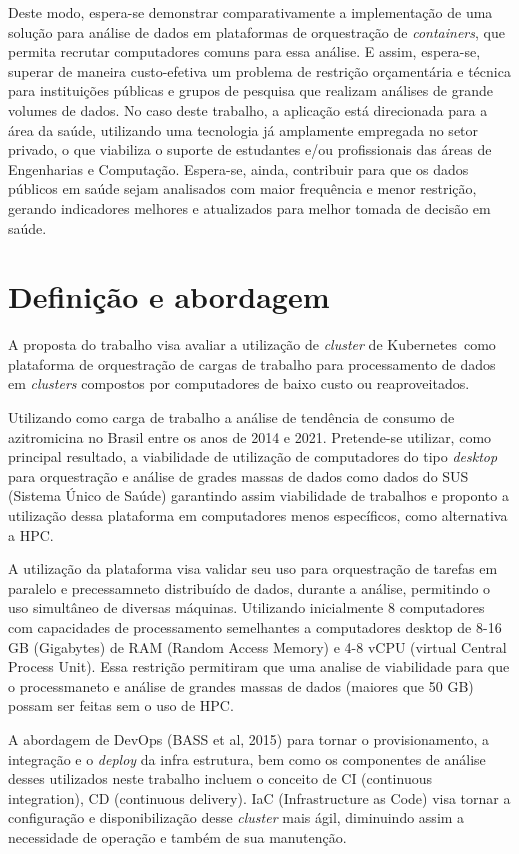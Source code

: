 Deste modo, espera-se demonstrar comparativamente a implementação de uma solução para análise de dados em plataformas de orquestração de \emph{containers}, que permita recrutar computadores comuns para essa análise. E assim, espera-se, superar de maneira custo-efetiva um problema de restrição orçamentária e técnica para instituições públicas e grupos de pesquisa que realizam análises de grande volumes de dados. No caso deste trabalho, a aplicação está direcionada para a área da saúde, utilizando uma tecnologia já amplamente empregada no setor privado, o que viabiliza o suporte de estudantes e/ou profissionais das áreas de Engenharias e Computação. Espera-se, ainda, contribuir para que os dados públicos em saúde sejam analisados com  maior frequência e menor restrição, gerando indicadores melhores e atualizados para melhor tomada de decisão em saúde.

\section{Definição e abordagem}
\label{sec:abordagem}

A proposta do trabalho visa avaliar a utilização de \emph{cluster} de Kubernetes\textregistered \ como plataforma de orquestração de cargas de trabalho para processamento de dados em \emph{clusters }compostos por computadores de baixo custo ou reaproveitados.

Utilizando como carga de trabalho a análise de tendência de consumo de azitromicina no Brasil entre os anos de 2014 e 2021. Pretende-se utilizar, como principal resultado, a viabilidade de utilização de computadores do tipo \emph{desktop} para orquestração e análise de grades massas de dados como dados do SUS (Sistema Único de Saúde) garantindo assim viabilidade de trabalhos e proponto a utilização dessa plataforma em computadores menos específicos, como alternativa a HPC.

A utilização da plataforma visa validar seu uso para orquestração de tarefas em paralelo e precessamneto distribuído de dados, durante a análise, permitindo o uso simultâneo de diversas máquinas. Utilizando inicialmente 8 computadores com capacidades de processamento semelhantes a computadores desktop de 8-16 GB (Gigabytes) de RAM (Random Access Memory) e 4-8 vCPU (virtual Central Process Unit). Essa restrição  permitiram que uma analise de viabilidade para que o processmaneto e análise de grandes massas de dados (maiores que 50 GB) possam ser feitas sem o uso de HPC.

A abordagem de DevOps (BASS et al, 2015) para tornar o provisionamento, a integração e o \emph{deploy} da infra estrutura, bem como os componentes de análise desses utilizados neste trabalho incluem o conceito de CI (continuous integration), CD (continuous delivery).  IaC (Infrastructure as Code) visa tornar a configuração e disponibilização desse \emph{cluster} mais ágil, diminuindo assim a necessidade de operação e também de sua manutenção.

